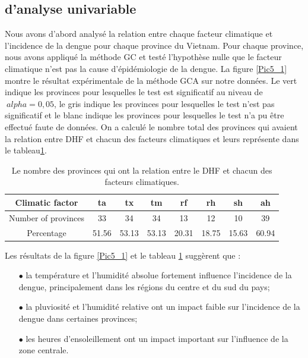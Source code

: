 \subsection{\Rs d'analyse univariable}
Nous avons d'abord analysé la relation entre chaque facteur climatique et l'incidence de la dengue pour chaque province du Vietnam. Pour chaque province, nous avons appliqué la méthode GC et testé l'hypothèse nulle que le facteur climatique n'est pas la cause d'épidémiologie de la dengue. La figure \ref{Pic5_1} montre le résultat expérimentale de la méthode GCA sur notre données. Le vert indique les provinces pour lesquelles le test est significatif au niveau de $ \ alpha = 0,05 $, le gris indique les provinces pour lesquelles le test n'est pas significatif et le blanc indique les provinces pour lesquelles le test n'a pu être effectué faute de données. On a calculé le nombre total des provinces qui avaient la relation entre DHF et chacun des facteurs climatiques et leurs représente dans le tableau\ref{table1}.

\begin{table}[h]
\centering
\begin{tabular} { | c | c | c | c | c | c | c | c |}
\hline
Climatic factor & ta & tx & tm & rf & rh & sh & ah \\
\hline
Number of provinces & 33 & 34 & 34 & 13 & 12 & 10 & 39 \\
\hline
Percentage & 51.56 & 53.13 & 53.13 & 20.31 & 18.75 & 15.63 & 60.94 \\
\hline
\end{tabular}
\caption{Le nombre des provinces qui ont la relation entre le DHF et chacun des facteurs climatiques.} 
\label{table1}
\end{table}

Les résultats de la figure \ref{Pic5_1}  et le tableau \ref{table1} suggèrent que : 

\begin{itemize} 
\item[$\bullet$] la température et l'humidité absolue fortement influence l'incidence de la dengue, principalement dans les régions du centre et du sud du pays;
\item[$\bullet$] la pluviosité et l'humidité relative ont un impact faible sur l'incidence de la dengue dans certaines provinces;
\item[$\bullet$] les heures d'ensoleillement ont un impact important sur l'influence de la zone centrale.
\end{itemize} 


